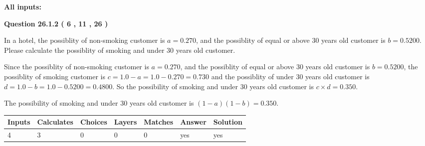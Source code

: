 \documentclass[12pt]{article}
\begin{document}
   
\noindent\vspace{0.1in}\hspace{-0.08in} {\textbf{\Large{All inputs: }}}
   
   
  
\vspace{0.2in}
  
{\textbf{\Large{Question
26.1.2 
 (           6 ,          11 ,          26 )
}}}
  
  
In a hotel, the possiblity of  %
non-smoking customer is
$a =  %
0.270$, and the possiblity of  %
equal or above 30 years old customer is $ b =  %
0.5200$.
Please calculate the possiblity of  %
smoking and  %
under 30 years old customer.
 
 
 
\noindent{}
 
 

Since the possiblity of  %
 non-smoking customer is $ a =  %
0.270 $,
and the possiblity of  %
equal or above 30 years old customer is $ b =  %
0.5200 $,
the possiblity of  %
smoking customer is $ c = 1.0 - a = 1.0 -
0.270
=  %
0.730 $ and the possiblity of  %
under 30 years old
customer is $ d = 1.0 - b = 1.0 -  %
0.5200 =  %
0.4800  $.
So the possibility of  %
smoking and  %
under 30 years old
customer is $ c \times d =  %
0.350 $.
 
 
 
\noindent{}
 
 

 
 
 
\noindent{}
 
 

The possibility of  %
smoking and  %
under 30 years old
customer is $ (1-a)(1-b) =  %
0.350 $.
 
 
\noindent{}
 
 

 
\vspace{0.3in}
   
   
   
   
\noindent\begin{tabular}{|l|l|l|l|l|l|l|}
 \hline
Inputs & Calculates & Choices & Layers & Matches & Answer & Solution \\ \hline
           4  & 
           3  & 
           0
  & 
           0  & 
           0  & 
  yes & 
  yes 
  \\ \hline
 \end{tabular}
   
\end{document}
